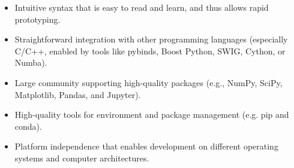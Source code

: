 \begin{itemize}
    \item Intuitive syntax that is easy to read and learn, and thus allows rapid prototyping.
    \item Straightforward integration with other programming languages (especially C/C++\cite{Stroustrup1995}, enabled by tools like pybinds\cite{Wenzel2011}, Boost Python\cite{Koranne2011}, SWIG\cite{Beazley1996}, Cython\cite{Behnel2011}, or Numba\cite{Lam2015}).
    \item Large community supporting high-quality packages (e.g., NumPy\cite{Vanderwalt2011}, SciPy\cite{Virtanen2020}, Matplotlib\cite{Hunter2007}, Pandas\cite{Mckinney2010}, and Jupyter\cite{Kluyver2016}).
    \item High-quality tools for environment and package management (e.g. pip\cite{Pypi2021} and conda\cite{Anaconda2020}).
    \item Platform independence that enables development on different operating systems and computer architectures.
\end{itemize}

